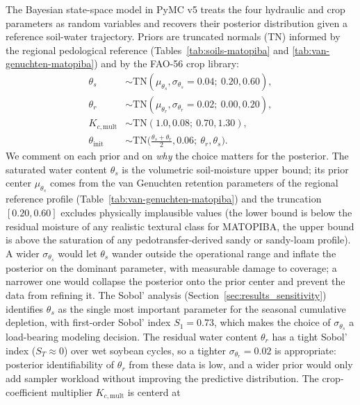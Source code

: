 \documentclass[review,5p,times]{elsarticle}
\begin{document}
The Bayesian state-space model in PyMC v5 \cite{AbrilPla2023} treats
the four hydraulic and crop parameters as random variables and
recovers their posterior distribution given a reference soil-water
trajectory. Priors are truncated normals (TN) informed by the
regional pedological reference (Tables~\ref{tab:soils-matopiba} and
\ref{tab:van-genuchten-matopiba}) and by the FAO-56 crop library:
%
\begin{equation}
\begin{aligned}
\theta_s &\sim \mathrm{TN}(\mu_{\theta_s}, \sigma_{\theta_s}=0.04;\ 0.20, 0.60), \\
\theta_r &\sim \mathrm{TN}(\mu_{\theta_r}, \sigma_{\theta_r}=0.02;\ 0.00, 0.20), \\
K_{c,\mathrm{mult}} &\sim \mathrm{TN}(1.0, 0.08;\ 0.70, 1.30), \\
\theta_{\mathrm{init}} &\sim \mathrm{TN}\bigl(\tfrac{\theta_s+\theta_r}{2}, 0.06;\ \theta_r, \theta_s\bigr).
\end{aligned}
\label{eq:priors}
\end{equation}
%
We comment on each prior and on \emph{why} the choice matters for
the posterior. The saturated water content $\theta_s$ is the
volumetric soil-moisture upper bound; its prior center
$\mu_{\theta_s}$ comes from the van Genuchten retention parameters of
the regional reference profile (Table~\ref{tab:van-genuchten-matopiba})
and the truncation $[0.20, 0.60]$ excludes physically implausible
values (the lower bound is below the residual moisture of any
realistic textural class for MATOPIBA, the upper bound is above the
saturation of any pedotransfer-derived sandy or sandy-loam profile).
A wider $\sigma_{\theta_s}$ would let $\theta_s$ wander outside the
operational range and inflate the posterior on the dominant
parameter, with measurable damage to coverage; a narrower one would
collapse the posterior onto the prior center and prevent the data
from refining it. The Sobol' analysis
(Section~\ref{sec:results_sensitivity}) identifies $\theta_s$ as the
single most important parameter for the seasonal cumulative
depletion, with first-order Sobol' index $S_1=0.73$, which makes the
choice of $\sigma_{\theta_s}$ a load-bearing modeling decision.
The residual water content $\theta_r$ has a tight Sobol' index
($S_T \approx 0$) over wet soybean cycles, so a tighter
$\sigma_{\theta_r}=0.02$ is appropriate: posterior identifiability
of $\theta_r$ from these data is low, and a wider prior would only
add sampler workload without improving the predictive distribution.
The crop-coefficient multiplier $K_{c,\mathrm{mult}}$ is centerd at
\end{document}
